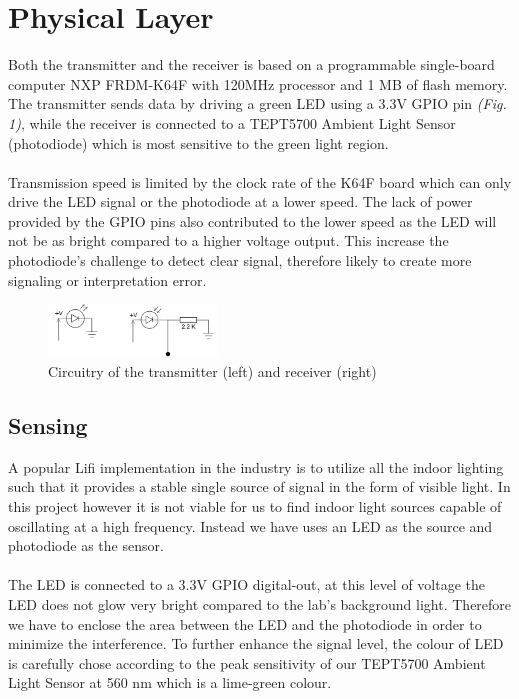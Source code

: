 \documentclass[letterpaper, 10 pt, conference]{ieeeconf}  %
\begin{document}
\section{Physical Layer}

Both the transmitter and the receiver is based on a programmable single-board computer NXP FRDM-K64F \cite{NXP2014} with 120MHz processor and 1 MB of flash memory. The transmitter sends data by driving a green LED using a 3.3V GPIO pin \textit{(Fig. 1)}, while the receiver is connected to a TEPT5700 Ambient Light Sensor\cite{VISHAY} (photodiode) which is most sensitive to the green light region.
\\ \\
Transmission speed is limited by the clock rate of the K64F board which can only drive the LED signal or the photodiode at a lower speed. The lack of power provided by the GPIO pins also contributed to the lower speed as the LED will not be as bright compared to a higher voltage output. This increase the photodiode's challenge to detect clear signal, therefore likely to create more signaling or interpretation error. 

\begin{figure}[h!]
  \centering
  \includegraphics[width=0.4\textwidth]{circuit.png}
  \caption{Circuitry of the transmitter (left) and receiver (right)}
\end{figure}

\subsection{Sensing}

A popular Lifi implementation in the industry is to utilize all the indoor lighting such that it provides a stable single source of signal in the form of visible light. In this project however it is not viable for us to find indoor light sources capable of oscillating at a high frequency. Instead we have uses an LED as the source and photodiode as the sensor. 
\\ \\
The LED is connected to a 3.3V GPIO digital-out, at this level of voltage the LED does not glow very bright compared to the lab’s background light. Therefore we have to enclose the area between the LED and the photodiode in order to minimize the interference. To further enhance the signal level, the colour of LED is carefully chose according to the peak sensitivity of our TEPT5700 Ambient Light Sensor\cite{VISHAY} at 560 nm which is a lime-green colour. 
\end{document}
